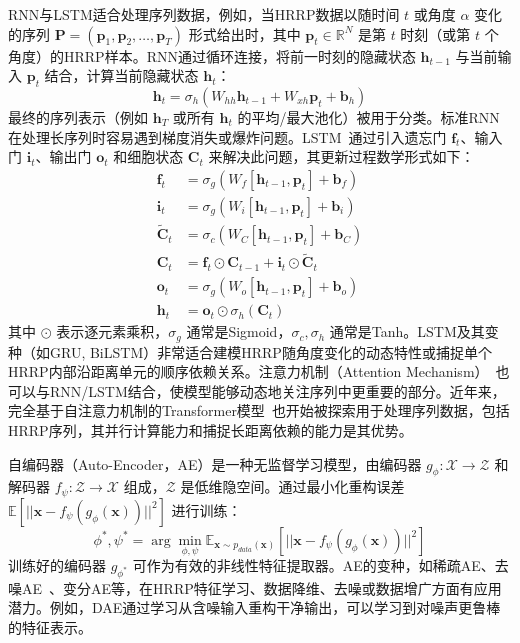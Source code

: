 RNN与LSTM适合处理序列数据，例如，当HRRP数据以随时间 $t$ 或角度 $\alpha$ 变化的序列 $\mathbf{P} = (\mathbf{p}_1, \mathbf{p}_2, \dots, \mathbf{p}_T)$ 形式给出时，其中 $\mathbf{p}_t \in \mathbb{R}^N$ 是第 $t$ 时刻（或第 $t$ 个角度）的HRRP样本。RNN通过循环连接，将前一时刻的隐藏状态 $\mathbf{h}_{t-1}$ 与当前输入 $\mathbf{p}_t$ 结合，计算当前隐藏状态 $\mathbf{h}_t$：
\begin{equation}
    \mathbf{h}_t = \sigma_h(W_{hh} \mathbf{h}_{t-1} + W_{xh} \mathbf{p}_t + \mathbf{b}_h)
    \label{eq:rnn_recurrence}
\end{equation}
最终的序列表示（例如 $\mathbf{h}_T$ 或所有 $\mathbf{h}_t$ 的平均/最大池化）被用于分类。标准RNN在处理长序列时容易遇到梯度消失或爆炸问题。LSTM~\cite{X}通过引入遗忘门 $\mathbf{f}_t$、输入门 $\mathbf{i}_t$、输出门 $\mathbf{o}_t$ 和细胞状态 $\mathbf{C}_t$ 来解决此问题，其更新过程数学形式如下：
\begin{align}
    \mathbf{f}_t &= \sigma_g(W_f [\mathbf{h}_{t-1}, \mathbf{p}_t] + \mathbf{b}_f) \label{eq:lstm_f} \\
    \mathbf{i}_t &= \sigma_g(W_i [\mathbf{h}_{t-1}, \mathbf{p}_t] + \mathbf{b}_i) \label{eq:lstm_i} \\
    \tilde{\mathbf{C}}_t &= \sigma_c(W_C [\mathbf{h}_{t-1}, \mathbf{p}_t] + \mathbf{b}_C) \label{eq:lstm_c_tilde} \\
    \mathbf{C}_t &= \mathbf{f}_t \odot \mathbf{C}_{t-1} + \mathbf{i}_t \odot \tilde{\mathbf{C}}_t \label{eq:lstm_c} \\
    \mathbf{o}_t &= \sigma_g(W_o [\mathbf{h}_{t-1}, \mathbf{p}_t] + \mathbf{b}_o) \label{eq:lstm_o} \\
    \mathbf{h}_t &= \mathbf{o}_t \odot \sigma_h(\mathbf{C}_t) \label{eq:lstm_h}
\end{align}
其中 $\odot$ 表示逐元素乘积，$\sigma_g$ 通常是Sigmoid，$\sigma_c, \sigma_h$ 通常是Tanh。LSTM及其变种（如GRU, BiLSTM）非常适合建模HRRP随角度变化的动态特性或捕捉单个HRRP内部沿距离单元的顺序依赖关系。注意力机制（Attention Mechanism）~\cite{X}也可以与RNN/LSTM结合，使模型能够动态地关注序列中更重要的部分。近年来，完全基于自注意力机制的Transformer模型~\cite{X}也开始被探索用于处理序列数据，包括HRRP序列，其并行计算能力和捕捉长距离依赖的能力是其优势。

自编码器（Auto-Encoder，AE）是一种无监督学习模型，由编码器 $g_\phi: \mathcal{X} \rightarrow \mathcal{Z}$ 和解码器 $f_\psi: \mathcal{Z} \rightarrow \mathcal{X}$ 组成，$\mathcal{Z}$ 是低维隐空间。通过最小化重构误差 $\mathbb{E}[ ||\mathbf{x} - f_\psi(g_\phi(\mathbf{x}))||^2 ]$ 进行训练：
\begin{equation}
    \phi^*, \psi^* = \arg\min_{\phi, \psi} \mathbb{E}_{\mathbf{x} \sim p_{data}(\mathbf{x})} [ ||\mathbf{x} - f_\psi(g_\phi(\mathbf{x}))||^2 ]
    \label{eq:ae_objective}
\end{equation}
训练好的编码器 $g_{\phi^*}$ 可作为有效的非线性特征提取器。AE的变种，如稀疏AE、去噪AE~\cite{X}、变分AE等，在HRRP特征学习、数据降维、去噪或数据增广方面有应用潜力。例如，DAE通过学习从含噪输入重构干净输出，可以学习到对噪声更鲁棒的特征表示。

